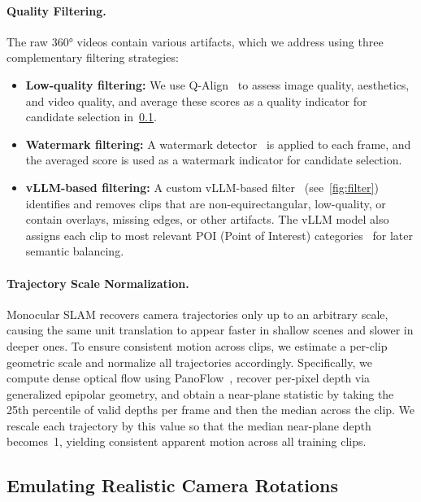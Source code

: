 \paragraph{Quality Filtering.}
The raw 360° videos contain various artifacts, which we address using three complementary filtering strategies:
\begin{itemize}
    \item \textbf{Low-quality filtering:} We use Q-Align~\cite{wu2024q} to assess image quality, aesthetics, and video quality, and average these scores as a quality indicator for candidate selection in~\cref{sec:emulate_rot}.
    \item \textbf{Watermark filtering:} A watermark detector~\cite{watermark} is applied to each frame, and the averaged score is used as a watermark indicator for candidate selection.
    \item \textbf{vLLM-based filtering:} A custom vLLM-based filter~\cite{bai2025qwen2} (see~\cref{fig:filter}) identifies and removes clips that are non-equirectangular, low-quality, or contain overlays, missing edges, or other artifacts.
    The vLLM model also assigns each clip to most relevant POI (Point of Interest) categories~\cite{xia2025panowan} for later semantic balancing.
\end{itemize}


\paragraph{Trajectory Scale Normalization.}
Monocular SLAM recovers camera trajectories only up to an arbitrary scale, causing the same unit translation to appear faster in shallow scenes and slower in deeper ones.  
To ensure consistent motion across clips, we estimate a per-clip geometric scale and normalize all trajectories accordingly.
Specifically, we compute dense optical flow using PanoFlow~\cite{shi2023panoflow}, recover per-pixel depth via generalized epipolar geometry, and obtain a near-plane statistic by taking the 25th percentile of valid depths per frame and then the median across the clip.
We rescale each trajectory by this value so that the median near-plane depth becomes~1, yielding consistent apparent motion across all training clips.

\subsection{Emulating Realistic Camera Rotations}
\label{sec:emulate_rot}


